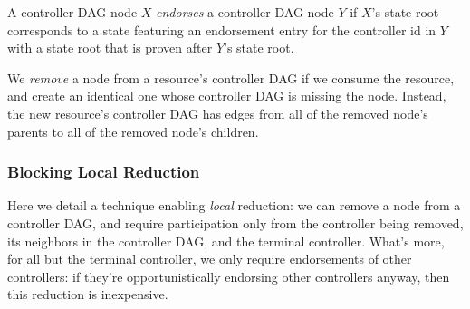 \documentclass[a4paper,USenglish,cleveref, autoref, thm-restate, anonymous]{lipics-v2021}
\begin{document}
\begin{definition}[Endorsement]
A controller DAG node $X$ \textit{endorses} a controller DAG node $Y$ if $X$'s state root corresponds to a state featuring an endorsement entry for the controller id in $Y$ with a state root that is proven after $Y$'s state root. 
\end{definition}

\begin{definition}[Remove]
We \textit{remove} a node from a resource's controller DAG if we consume the resource, and create an identical one whose controller DAG is missing the node. 
Instead, the new resource's controller DAG has edges from all of the removed node's parents to all of the removed node's children.
\end{definition}


\subsubsection{Blocking Local Reduction}
\label{sec:blockinglocalreduction}
Here we detail a technique enabling \emph{local} reduction: we can remove a node from a controller DAG, and require participation only from the controller being removed, its neighbors in the controller DAG, and the terminal controller. 
What's more, for all but the terminal controller, we only require endorsements of other controllers: if they're opportunistically endorsing other controllers anyway, then this reduction is inexpensive.
\end{document}
